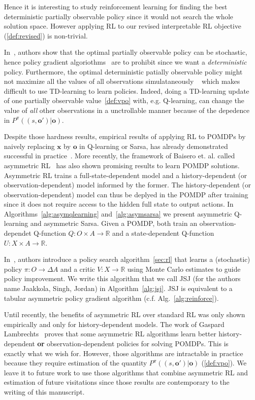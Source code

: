 Hence it is interesting to study reinforcement learning for finding the best deterministic partially observable policy since it would not search the whole solution space.
However applying RL to our revised interpretable RL objective (\ref{def:revised}) is non-trivial.

In~\cite[Fact 2]{learning-pomdp}, authors show that the optimal partially observable policy can be stochastic, hence policy gradient algoriothms~\cite{pg_sutton} are to prohibit since we want a \textit{deterministic} policy. 
Furthermore, the optimal deterministic patially observable policy might not maximize all the values of all observations simulataneously ~\cite[Fact 5]{learning-pomdp} which makes difficult to use TD-learning to learn policies.
Indeed, doing a TD-learning update of one partially observable value~\ref{def:vpo} with, e.g. Q-learning, can change the value of \textit{all} other observations in a unctrollable manner because of the depedence in $P^{\pi}((s, \boldsymbol{o}')|\boldsymbol{o})$.

Despite those hardness results, empirical results of applying RL to POMDPs by naively replacing $\boldsymbol{x}$ by $\boldsymbol{o}$ in Q-learning or Sarsa, has already demonstrated successful in practice~\cite{sarsa-pomdp}. 
More recently, the framework of Baisero et. al. called asymmetric RL~\cite{baisero-dqn,baisero-ppo} has also shown promising results to learn POMDP solutions.
Asymmetric RL trains a full-state-dependent model and a history-dependent (or observation-dependent) model informed by the former.
The history-dependent (or observation-dependent) model can thus be deplyed in the POMDP after training since it does not require access to the hidden full state to output actions.
In Algorithms~\ref{alg:asymqlearning} and~\ref{alg:asymsarsa} we present asymmetric Q-learning and asymmetric Sarsa. Given a POMDP, both train an observation-dependet Q-function $Q:O\times A\rightarrow\mathbb{R}$ and a state-dependent Q-function $U:X\times A\rightarrow\mathbb{R}$.

In~\cite{jsj}, authors introduce a policy search algorithm~\ref{sec:rl} that learns a (stochastic) policy $\pi:O\rightarrow\Delta A$ and a critic $V:X\rightarrow \mathbb{R}$ using Monte Carlo estimates to guide policy improvement.
We write this algorithm that we call JSJ (for the authors name Jaakkola, Singh, Jordan) in Algorithm~\ref{alg:jsj}. JSJ is equivalent to a tabular asymmetric policy gradient algorithm (c.f. Alg.~\ref{alg:reinforce}). 

Until recently, the benefits of asymmetric RL over standard RL was only shown empirically and only for history-dependent models.
The work of Gaspard Lambrechts~\cite{justif-asym} proves that some asymmetric RL algorithms learn better history-dependent \textbf{or} observation-dependent policies for solving POMDPs.
This is exactly what we wish for. However, those algorithms are intractable in practice because they require estimation of the quantity $P^{\pi}((s, \boldsymbol{o}')|\boldsymbol{o})$ (\ref{def:vpo}).
We leave it to future work to use those algorithms that combine asymmetric RL and estimation of future visitations since those results are contemporary to the writing of this manuscript.

